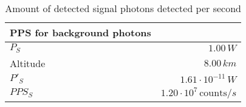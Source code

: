 \begin{table}[H]
\centering
\caption{Amount of detected signal photons detected per second}
\label{tab:PPS_S}
\begin{tabular}{|l|r|}\hline
    \textbf{PPS for background photons} & \\
    \hline 
    $P_S$ & $1.00\,W$ \\
    Altitude & $8.00\, km$ \\
    $P'_S$ & $1.61\cdot10^{-11}\,W$ \\
    $PPS_S$ & $1.20\cdot10^{7}\,\text{counts}/s$ \\
    \hline 
\end{tabular}
\end{table}
